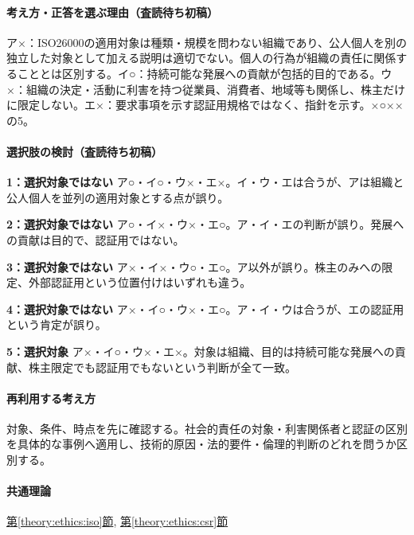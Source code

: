 \paragraph{考え方・正答を選ぶ理由（査読待ち初稿）} ア×：ISO26000の適用対象は種類・規模を問わない組織であり、公人個人を別の独立した対象として加える説明は適切でない。個人の行為が組織の責任に関係することとは区別する。イ○：持続可能な発展への貢献が包括的目的である。ウ×：組織の決定・活動に利害を持つ従業員、消費者、地域等も関係し、株主だけに限定しない。エ×：要求事項を示す認証用規格ではなく、指針を示す。×○××の5。

\paragraph{選択肢の検討（査読待ち初稿）}\mbox{}\par

\noindent\textbf{1：選択対象ではない} ア○・イ○・ウ×・エ×。イ・ウ・エは合うが、アは組織と公人個人を並列の適用対象とする点が誤り。\par

\noindent\textbf{2：選択対象ではない} ア○・イ×・ウ×・エ○。ア・イ・エの判断が誤り。発展への貢献は目的で、認証用ではない。\par

\noindent\textbf{3：選択対象ではない} ア×・イ×・ウ○・エ○。ア以外が誤り。株主のみへの限定、外部認証用という位置付けはいずれも違う。\par

\noindent\textbf{4：選択対象ではない} ア×・イ○・ウ×・エ○。ア・イ・ウは合うが、エの認証用という肯定が誤り。\par

\noindent\textbf{5：選択対象} ア×・イ○・ウ×・エ×。対象は組織、目的は持続可能な発展への貢献、株主限定でも認証用でもないという判断が全て一致。\par

\paragraph{再利用する考え方} 対象、条件、時点を先に確認する。社会的責任の対象・利害関係者と認証の区別を具体的な事例へ適用し、技術的原因・法的要件・倫理的判断のどれを問うか区別する。

\paragraph{共通理論} \hyperref[theory:ethics:iso]{第\ref*{theory:ethics:iso}節}, \hyperref[theory:ethics:csr]{第\ref*{theory:ethics:csr}節}

